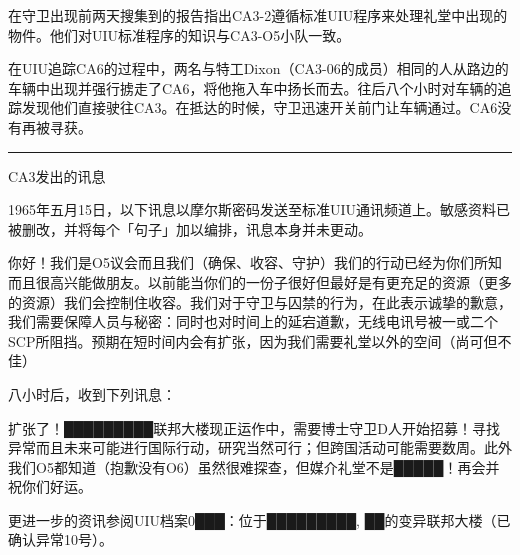 在守卫出现前两天搜集到的报告指出CA3-2遵循标准UIU程序来处理礼堂中出现的物件。他们对UIU标准程序的知识与CA3-O5小队一致。

在UIU追踪CA6的过程中，两名与特工Dixon（CA3-06的成员）相同的人从路边的车辆中出现并强行掳走了CA6，将他拖入车中扬长而去。往后八个小时对车辆的追踪发现他们直接驶往CA3。在抵达的时候，守卫迅速开关前门让车辆通过。CA6没有再被寻获。

\vs\hrule

CA3发出的讯息

1965年五月15日，以下讯息以摩尔斯密码发送至标准UIU通讯频道上。敏感资料已被删改，并将每个「句子」加以编排，讯息本身并未更动。

\begin{scpbox}
你好！我们是O5议会而且我们（确保、收容、守护）我们的行动已经为你们所知而且很高兴能做朋友。以前能当你们的一份子很好但最好是有更充足的资源（更多的资源）我们会控制住收容。我们对于守卫与囚禁的行为，在此表示诚挚的歉意，我们需要保障人员与秘密：同时也对时间上的延宕道歉，无线电讯号被一或二个SCP所阻挡。预期在短时间内会有扩张，因为我们需要礼堂以外的空间（尚可但不佳）
\end{scpbox}

八小时后，收到下列讯息：

\begin{scpbox}
  扩张了！█████████联邦大楼现正运作中，需要博士守卫D人开始招募！寻找异常而且未来可能进行国际行动，研究当然可行；但跨国活动可能需要数周。此外我们O5都知道（抱歉没有O6）虽然很难探查，但媒介礼堂不是█████！再会并祝你们好运。
\end{scpbox}

更进一步的资讯参阅UIU档案0███：位于█████████, ██的变异联邦大楼（已确认异常10号）。
